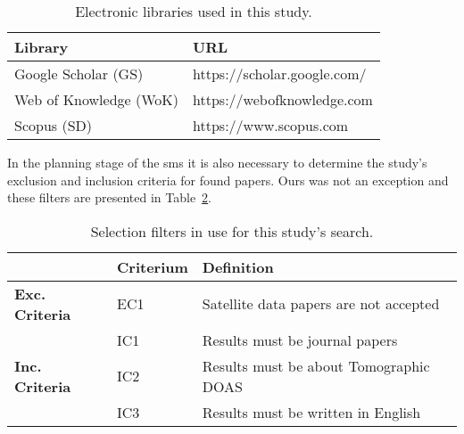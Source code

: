 \begin{table}[htb]
\centering
\caption{Electronic libraries used in this study.}
\label{tab:libraries_sms}
    \begin{tabularx}{\textwidth}{ll}
        \toprule
        \textbf{Library}          & \textbf{URL}\\
        \midrule
        Google Scholar (GS)   & https://scholar.google.com/\\
        Web of Knowledge (WoK)& https://webofknowledge.com\\
        Scopus (SD)   & https://www.scopus.com\\
        \bottomrule
    \end{tabularx}
\end{table}

In the planning stage of the \gls{sms} it is also necessary to determine
the study's exclusion and inclusion criteria for found papers. Ours was
not an exception and these filters are presented in
Table~\ref{tab:select_filters_sms}.

\begin{table}[htb]
\centering
\caption{Selection filters in use for this study's search.}
\label{tab:select_filters_sms}
\begin{tabularx}{\textwidth}{lXl}%
\toprule
\multicolumn{1}{l}{} & \textbf{Criterium} & \textbf{Definition} \\ \midrule
\multirow{1}{*}{\textbf{Exc. Criteria}} & EC1 & Satellite data papers
are not accepted \\
\midrule
\multicolumn{1}{l}{\multirow{3}{*}{\textbf{Inc. Criteria}}} & IC1 &
Results must be journal papers \\
\multicolumn{1}{l}{} & IC2 & Results must be about Tomographic DOAS \\ 
\multicolumn{1}{l}{} & IC3 & Results must be written in English \\
\bottomrule
\end{tabularx}
\end{table}
